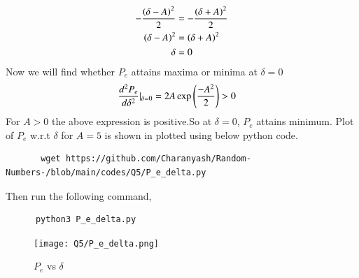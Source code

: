 \documentclass[journal,12pt,twocolumn]{IEEEtran}
\renewcommand\thesection{\arabic{section}}
\begin{document}
\begin{enumerate}[label=\thesection.\arabic*,ref=\thesection.\theenumi]
\begin{enumerate}[label=\thesection.\arabic*
,ref=\thesection.\theenumi]
\begin{align}
	    - \frac{\left(\delta - A\right)^2}{2} &= -\frac{\left(\delta + A\right)^2}{2}\\
		  \left(\delta - A\right)^2 &= \left(\delta + A\right)^2\\
		  \delta &= 0 
     \end{align}
    Now we will find whether $P_e$ attains maxima or minima at $\delta = 0$
     \begin{align}
	     \frac{d^2P_e}{d\delta^{2}}|_{\delta = 0} &= 2A\exp\left(\frac{-A^{2}}{2}\right) > 0
     \end{align}
    For $A>0$ the above expression is positive.So at $\delta = 0$, $P_e$ attains minimum. Plot of $P_e$ w.r.t $\delta$ for $ A=5$ is shown in  plotted using below python code.
     \begin{lstlisting}
       wget https://github.com/Charanyash/Random-Numbers-/blob/main/codes/Q5/P_e_delta.py
     \end{lstlisting}                              
     Then run the following command,
     \begin{lstlisting}
      python3 P_e_delta.py
     \end{lstlisting}
    \begin{figure}
     \centering
     \texttt{[image: Q5/P\_e\_delta.png]}
     \caption{$P_e$ vs $\delta$}
     \label{fig:P_e_delta}
    \end{figure}
 

\end{enumerate}
\end{enumerate}
\end{document}
